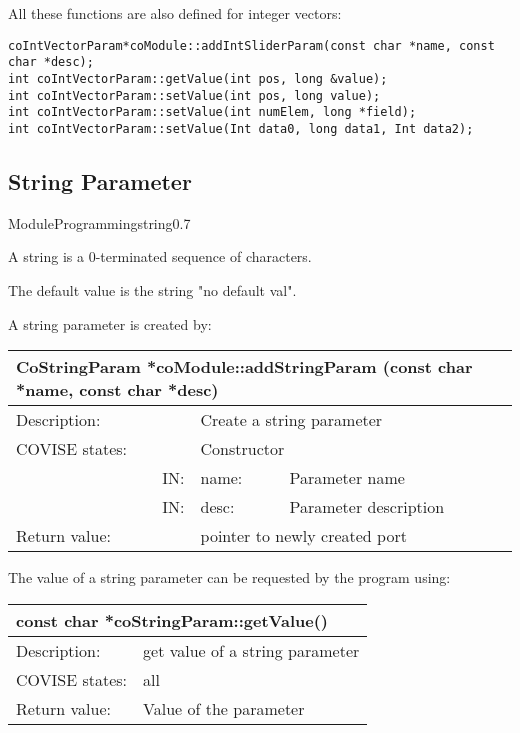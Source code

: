 All these functions are also defined for integer vectors:

\begin{verbatim}
coIntVectorParam*coModule::addIntSliderParam(const char *name, const char *desc);
int coIntVectorParam::getValue(int pos, long &value);
int coIntVectorParam::setValue(int pos, long value);
int coIntVectorParam::setValue(int numElem, long *field);
int coIntVectorParam::setValue(Int data0, long data1, Int data2);
\end{verbatim}



\subsection{String Parameter}


\begin{covimgpath}{ModuleProgramming}{string}{0.7} \end{covimgpath}


A string is a 0-terminated sequence of characters. 

The default value is the string "no default val".

A string parameter is created by:

\begin{longtable}{|p{4cm}|p{2.5cm}|p{7cm}|}
\hline
\multicolumn{3}{|p{13.5cm}|}{\bf CoStringParam *coModule::addStringParam 
(const char *name, const char *desc)} \\
\hline
{Description:}   
                        & \multicolumn{2}{|p{9.5cm}|}{Create a string parameter} \\
\hline
{COVISE states:} & \multicolumn{2}{|p{9.5cm}|}{Constructor} \\
\hline
\multicolumn{1}{|r|}{IN:} & {name:} 
                             & {Parameter name}\\
\hline
\multicolumn{1}{|r|}{IN:} & {desc:} 
                            & {Parameter description}\\
\hline
{Return value:}  
                        & \multicolumn{2}{|p{9.5cm}|}{pointer to newly created port} \endhead
\hline
\end{longtable}

The value of a string parameter can be requested by the program using:

\begin{longtable}{|p{4cm}|p{10cm}|}
\hline
\multicolumn{2}{|p{13.5cm}|}{\bf const char *coStringParam::getValue()} \\
\hline
{Description:}   
                        & {get value of a string parameter} \\
\hline
{COVISE states:} & {all} \\
\hline
{Return value:}  
                        & {Value of the parameter} \endhead
\hline
\end{longtable}

